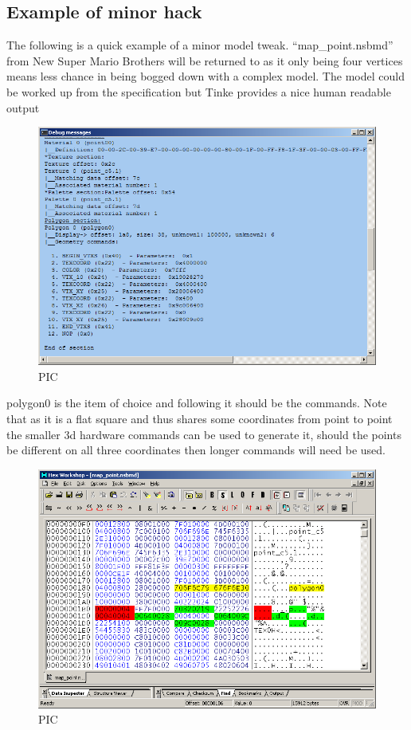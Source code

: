 \documentclass[
]{book}
\begin{document}
\hypertarget{example-of-minor-hack}{%
\subsection{Example of minor hack}\label{example-of-minor-hack}}

The following is a quick example of a minor model tweak. ``map\_point.nsbmd'' from New Super Mario Brothers will be returned to as it only being four vertices means less chance in being bogged down with a complex model. The model could be worked up from the specification but Tinke provides a nice human readable output

\begin{figure}
\centering
\includegraphics{images/63_home_fast6191_romhackingguide_unrenamed_file____romhackingguidegraphics3dminorNSMBDmodel_1.png}
\caption{PIC}
\end{figure}

polygon0 is the item of choice and following it should be the commands. Note that as it is a flat square and thus shares some coordinates from point to point the smaller 3d hardware commands can be used to generate it, should the points be different on all three coordinates then longer commands will need be used.

\begin{figure}
\centering
\includegraphics{images/64_home_fast6191_romhackingguide_unrenamed_file___gguidegraphics3dminorNSMBDmodel_hexeditor_1.png}
\caption{PIC}
\end{figure}
\end{document}
